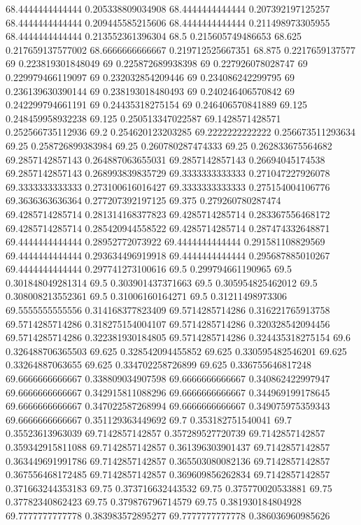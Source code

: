 {68.4444444444444 0.205338809034908
68.4444444444444 0.207392197125257
68.4444444444444 0.209445585215606
68.4444444444444 0.211498973305955
68.4444444444444 0.213552361396304
68.5 0.215605749486653
68.625 0.217659137577002
68.6666666666667 0.219712525667351
68.875 0.2217659137577
69 0.223819301848049
69 0.225872689938398
69 0.227926078028747
69 0.229979466119097
69 0.232032854209446
69 0.234086242299795
69 0.236139630390144
69 0.238193018480493
69 0.240246406570842
69 0.242299794661191
69 0.24435318275154
69 0.246406570841889
69.125 0.248459958932238
69.125 0.250513347022587
69.1428571428571 0.252566735112936
69.2 0.254620123203285
69.2222222222222 0.256673511293634
69.25 0.258726899383984
69.25 0.260780287474333
69.25 0.262833675564682
69.2857142857143 0.264887063655031
69.2857142857143 0.26694045174538
69.2857142857143 0.268993839835729
69.3333333333333 0.271047227926078
69.3333333333333 0.273100616016427
69.3333333333333 0.275154004106776
69.3636363636364 0.277207392197125
69.375 0.279260780287474
69.4285714285714 0.281314168377823
69.4285714285714 0.283367556468172
69.4285714285714 0.285420944558522
69.4285714285714 0.287474332648871
69.4444444444444 0.28952772073922
69.4444444444444 0.291581108829569
69.4444444444444 0.293634496919918
69.4444444444444 0.295687885010267
69.4444444444444 0.297741273100616
69.5 0.299794661190965
69.5 0.301848049281314
69.5 0.303901437371663
69.5 0.305954825462012
69.5 0.308008213552361
69.5 0.31006160164271
69.5 0.31211498973306
69.5555555555556 0.314168377823409
69.5714285714286 0.316221765913758
69.5714285714286 0.318275154004107
69.5714285714286 0.320328542094456
69.5714285714286 0.322381930184805
69.5714285714286 0.324435318275154
69.6 0.326488706365503
69.625 0.328542094455852
69.625 0.330595482546201
69.625 0.33264887063655
69.625 0.334702258726899
69.625 0.336755646817248
69.6666666666667 0.338809034907598
69.6666666666667 0.340862422997947
69.6666666666667 0.342915811088296
69.6666666666667 0.344969199178645
69.6666666666667 0.347022587268994
69.6666666666667 0.349075975359343
69.6666666666667 0.351129363449692
69.7 0.353182751540041
69.7 0.35523613963039
69.7142857142857 0.357289527720739
69.7142857142857 0.359342915811088
69.7142857142857 0.361396303901437
69.7142857142857 0.363449691991786
69.7142857142857 0.365503080082136
69.7142857142857 0.367556468172485
69.7142857142857 0.369609856262834
69.7142857142857 0.371663244353183
69.75 0.373716632443532
69.75 0.375770020533881
69.75 0.37782340862423
69.75 0.379876796714579
69.75 0.381930184804928
69.7777777777778 0.383983572895277
69.7777777777778 0.386036960985626
}

